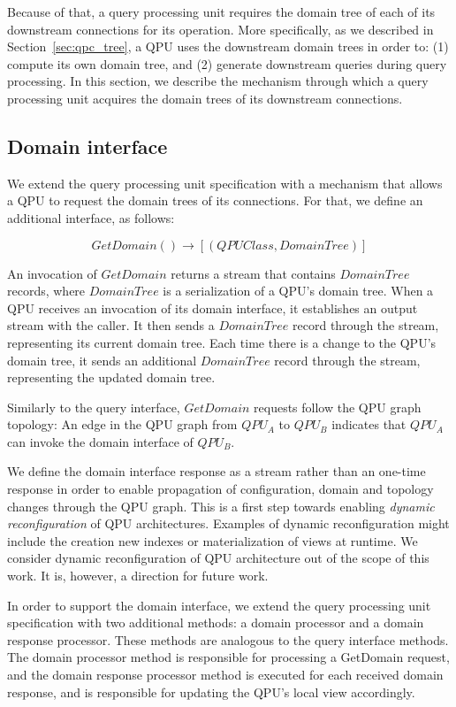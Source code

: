 Because of that, a query processing unit requires the domain tree of each of its downstream connections for its operation.
More specifically, as we described in Section~\ref{sec:qpc_tree}, a QPU uses the downstream domain trees in order to:
(1) compute its own domain tree, and (2) generate downstream queries during query processing.
In this section, we describe the mechanism through which a query processing unit acquires the domain trees
of its downstream connections.

\subsection{Domain interface}
We extend the query processing unit specification with a mechanism that allows a QPU to request the domain trees of its connections.
For that, we define an additional interface, as follows:

\begin{displaymath}
  GetDomain() \rightarrow [(QPUClass, DomainTree)]
\end{displaymath}

An invocation of $GetDomain$ returns a stream that contains $DomainTree$ records, where $DomainTree$ is a serialization of a QPU's domain tree.
When a QPU receives an invocation of its domain interface, it establishes an output stream with the caller.
It then sends a $DomainTree$ record through the stream, representing its current domain tree.
Each time there is a change to the QPU's domain tree, it sends an additional $DomainTree$ record through the stream,
representing the updated domain tree.

Similarly to the query interface, $GetDomain$ requests follow the QPU graph topology:
An edge in the QPU graph from $QPU_A$ to $QPU_B$ indicates that $QPU_A$ can invoke the domain interface of $QPU_B$.

\medskip
\noindent
We define the domain interface response as a stream rather than an one-time response in order to enable propagation of
configuration, domain and topology changes through the QPU graph.
This is a first step towards enabling \textit{dynamic reconfiguration} of QPU architectures.
Examples of dynamic reconfiguration might include the creation new indexes or materialization of views at runtime.
We consider dynamic reconfiguration of QPU architecture out of the scope of this work.
It is, however, a direction for future work.

\medskip
\noindent
In order to support the domain interface, we extend the query processing unit specification with two additional methods:
a domain processor and a domain response processor.
These methods are analogous to the query interface methods.
The domain processor method is responsible for processing a GetDomain request,
and the domain response processor method is executed for each received domain response,
and is responsible for updating the QPU's local view accordingly.

